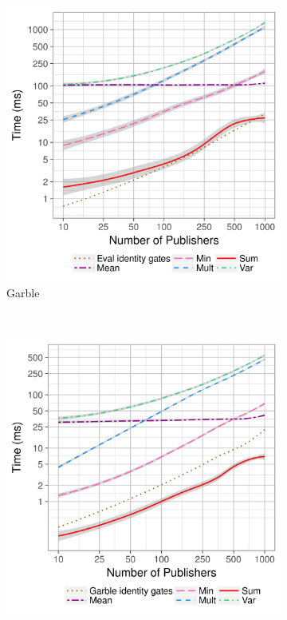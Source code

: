 \begin{figure}
    \centering
    \begin{subfigure}[b]{0.32\textwidth}
        \includegraphics[width=\textwidth]{plots/garble_loglog.png}
        \caption{Garble}
        \label{fig:micro-garble-time}
    \end{subfigure}
    ~ %
    \begin{subfigure}[b]{0.32\textwidth}
        \includegraphics[width=\textwidth]{plots/eval_loglog.png}

\end{subfigure}
\end{figure}
